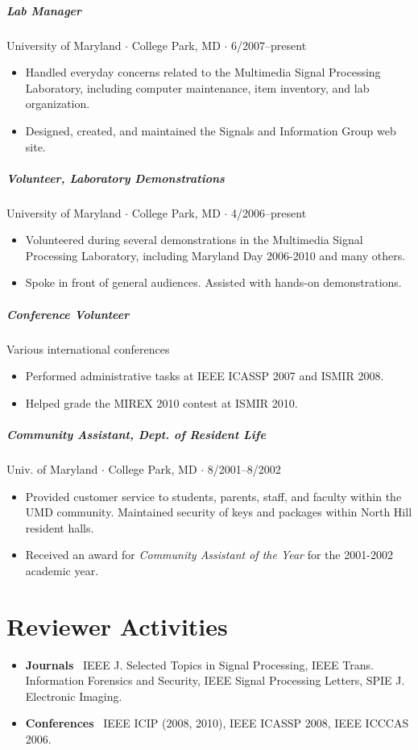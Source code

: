 \documentclass[10pt,letterpaper]{article}
\begin{document}
\subparagraph{Lab Manager}
University of Maryland $\cdot$ College Park, MD $\cdot$ 6/2007--present
\begin{itemize}
	\item Handled everyday concerns related to the Multimedia Signal Processing Laboratory, including computer maintenance, item inventory, and lab organization.
	\item Designed, created, and maintained the Signals and Information Group web site.
\end{itemize}


\subparagraph{Volunteer, Laboratory Demonstrations}
University of Maryland $\cdot$ College Park, MD $\cdot$ 4/2006--present
\begin{itemize}
    \item Volunteered during several demonstrations in the Multimedia Signal Processing Laboratory, including Maryland Day 2006-2010 and many others.
    \item Spoke in front of general audiences. Assisted with hands-on demonstrations.
\end{itemize}

\subparagraph{Conference Volunteer}
Various international conferences
\begin{itemize}
\item Performed administrative tasks at IEEE ICASSP 2007 and ISMIR 2008.
\item Helped grade the MIREX 2010 contest at ISMIR 2010.
\end{itemize}

\subparagraph{Community Assistant, Dept. of Resident Life}
Univ. of Maryland $\cdot$ College Park, MD $\cdot$ 8/2001--8/2002
\begin{itemize}
    \item Provided customer service to students, parents, staff, and faculty within the UMD community. Maintained security of keys and packages within North Hill resident halls.
    \item Received an award for \textit{Community Assistant of the Year} for the 2001-2002 academic year.

\end{itemize}

\section*{Reviewer Activities}

\begin{itemize}
	\item \textbf{Journals} \ IEEE J. Selected Topics in Signal Processing, IEEE Trans. Information Forensics and Security, IEEE Signal Processing Letters, SPIE J. Electronic Imaging.
    \item \textbf{Conferences} \ IEEE ICIP (2008, 2010), IEEE ICASSP 2008, IEEE ICCCAS 2006.
\end{itemize}
\end{document}
